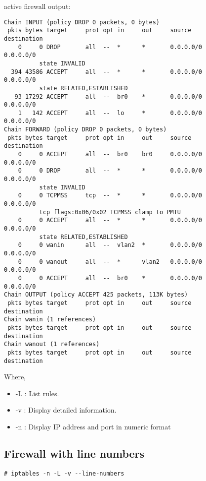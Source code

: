 active firewall output:
\begin{verbatim}
Chain INPUT (policy DROP 0 packets, 0 bytes)
 pkts bytes target     prot opt in     out     source               destination
    0     0 DROP       all  --  *      *       0.0.0.0/0            0.0.0.0/0 
          state INVALID
  394 43586 ACCEPT     all  --  *      *       0.0.0.0/0            0.0.0.0/0 
          state RELATED,ESTABLISHED
   93 17292 ACCEPT     all  --  br0    *       0.0.0.0/0            0.0.0.0/0
    1   142 ACCEPT     all  --  lo     *       0.0.0.0/0            0.0.0.0/0
Chain FORWARD (policy DROP 0 packets, 0 bytes)
 pkts bytes target     prot opt in     out     source               destination
    0     0 ACCEPT     all  --  br0    br0     0.0.0.0/0            0.0.0.0/0
    0     0 DROP       all  --  *      *       0.0.0.0/0            0.0.0.0/0 
          state INVALID
    0     0 TCPMSS     tcp  --  *      *       0.0.0.0/0            0.0.0.0/0 
          tcp flags:0x06/0x02 TCPMSS clamp to PMTU
    0     0 ACCEPT     all  --  *      *       0.0.0.0/0            0.0.0.0/0 
          state RELATED,ESTABLISHED
    0     0 wanin      all  --  vlan2  *       0.0.0.0/0            0.0.0.0/0
    0     0 wanout     all  --  *      vlan2   0.0.0.0/0            0.0.0.0/0
    0     0 ACCEPT     all  --  br0    *       0.0.0.0/0            0.0.0.0/0
Chain OUTPUT (policy ACCEPT 425 packets, 113K bytes)
 pkts bytes target     prot opt in     out     source               destination
Chain wanin (1 references)
 pkts bytes target     prot opt in     out     source               destination
Chain wanout (1 references)
 pkts bytes target     prot opt in     out     source               destination
\end{verbatim}
Where,
\begin{itemize}
\item -L : List rules.
\item -v : Display detailed information.
\item -n : Display IP address and port in numeric format
\end{itemize}

\subsection{Firewall with line numbers}
\begin{verbatim}
# iptables -n -L -v --line-numbers
\end{verbatim}

